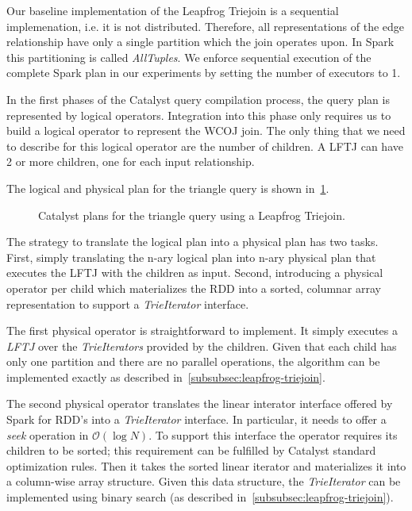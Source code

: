 Our baseline implementation of the Leapfrog Triejoin is a sequential implemenation, i.e. it is not distributed.
Therefore, all representations of the edge relationship have only a single partition which the join operates upon.
In Spark this partitioning is called \textit{AllTuples}.
We enforce sequential execution of the complete Spark plan in our experiments by setting the number of executors to 1.

In the first phases of the Catalyst query compilation process, the query plan is represented by logical operators.
Integration into this phase only requires us to build a logical operator to represent the \textsc{WCOJ} join.
The only thing that we need to describe for this logical operator are the number of children.
A \textsc{LFTJ} can have 2 or more children, one for each input relationship.

The logical and physical plan for the triangle query is shown in~\cref{fig:lftj-catalyst-plan}.

\begin{figure}
    \caption{Catalyst plans for the triangle query using a Leapfrog Triejoin.}
    \label{fig:lftj-catalyst-plan}
\end{figure}

The strategy to translate the logical plan into a physical plan has two tasks.
First, simply translating the n-ary logical plan into n-ary physical plan that executes the \textsc{LFTJ} with the children as input.
Second, introducing a physical operator per child which materializes the RDD into a sorted, columnar array representation to support a
\textit{TrieIterator} interface.

The first physical operator is straightforward to implement.
It simply executes a \textit{LFTJ} over the \textit{TrieIterators} provided by the children.
Given that each child has only one partition and there are no parallel operations, the algorithm can be implemented exactly
as described in~\cref{subsubsec:leapfrog-triejoin}.

The second physical operator translates the linear interator interface offered by Spark for RDD's into a \textit{TrieIterator} interface.
In particular, it needs to offer a \textit{seek} operation in $\mathcal{O} (\log N) $.
To support this interface the operator requires its children to be sorted;
this requirement can be fulfilled by Catalyst standard optimization rules.
Then it takes the sorted linear iterator and materializes it into a column-wise array structure.
Given this data structure, the \textit{TrieIterator} can be implemented using binary search (as described
in~\cref{subsubsec:leapfrog-triejoin}).

